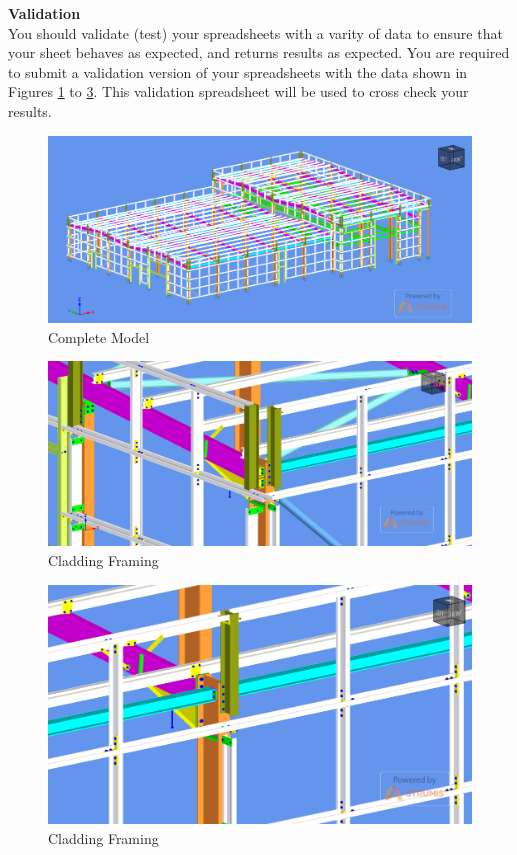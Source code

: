 \textbf{Validation}\\
You should validate (test) your spreadsheets with a varity of data to ensure that your sheet behaves as expected, and returns results as expected.  You are required to submit a validation version of your spreadsheets with the data shown in Figures \ref{fig:ass3img1} to \ref{fig:ass3img3}.  This validation spreadsheet will be used to cross check your results.

\begin{figure}
	\centering
	\includegraphics[width=1.0\linewidth]{a3img/1.png}
	\caption{Complete Model}
	\label{fig:ass3img1}
\end{figure}

\begin{figure}
	\centering
	\includegraphics[width=1.0\linewidth]{a3img/2.png}
	\caption{Cladding Framing}
	\label{fig:ass3img2}
\end{figure}

\begin{figure}
	\centering
	\includegraphics[width=1.0\linewidth]{a3img/3.png}
	\caption{Cladding Framing}
	\label{fig:ass3img3}
\end{figure}

